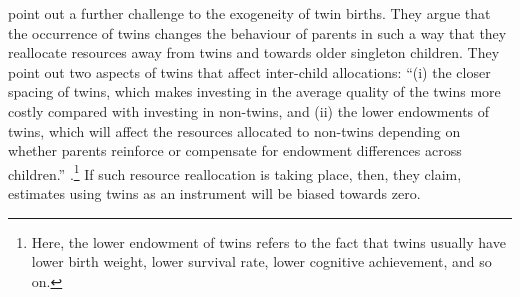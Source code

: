 \textcite{rosenzweig_population_2009} point out a further challenge to the exogeneity of twin births. They argue that the occurrence of twins changes the behaviour of parents in such a way that they reallocate resources away from twins and towards older singleton children. They point out two aspects of twins that affect inter-child allocations: \enquote{(i) the closer spacing of twins, which makes investing in the average quality of the twins more costly compared with investing in non-twins, and (ii) the lower endowments of twins, which will affect the resources allocated to non-twins depending on whether parents reinforce or compensate for endowment differences across children.} \parencite[1152]{rosenzweig_population_2009}.\footnote{ Here, the lower endowment of twins refers to the fact that twins usually have lower birth weight, lower survival rate, lower cognitive achievement, and so on. } If such resource reallocation is taking place, then, they claim, estimates using twins as an instrument will be biased towards zero.

